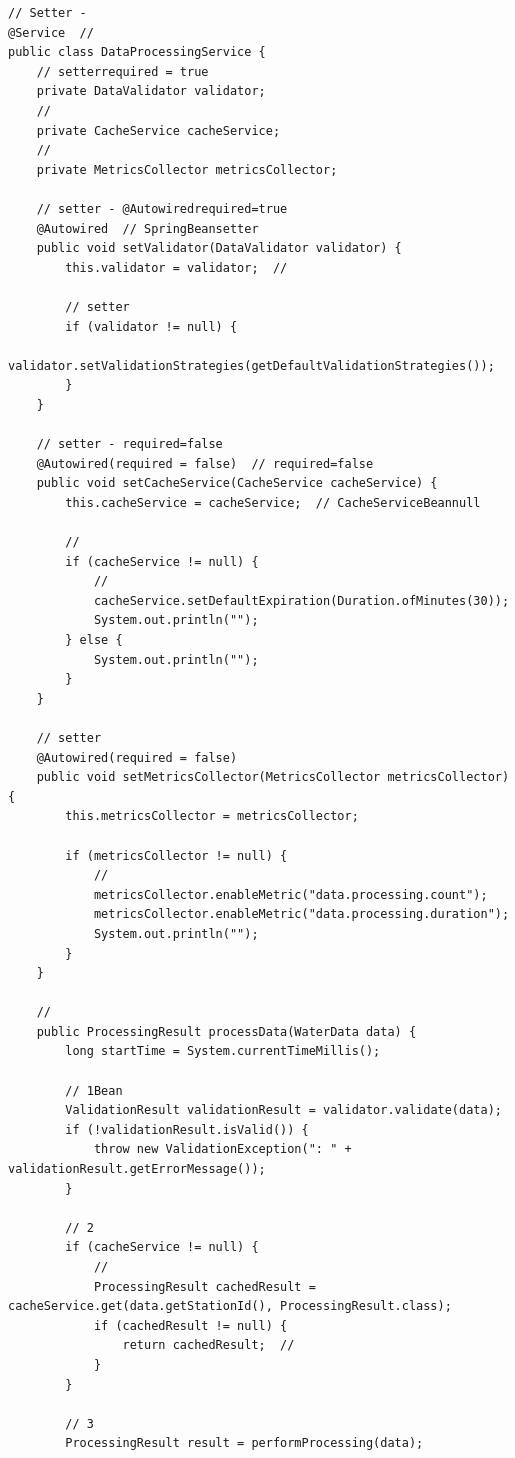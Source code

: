 \begin{lstlisting}[style=java]
// Setter - 
@Service  // 
public class DataProcessingService {
    // setterrequired = true
    private DataValidator validator;
    // 
    private CacheService cacheService;  
    // 
    private MetricsCollector metricsCollector;  
    
    // setter - @Autowiredrequired=true
    @Autowired  // SpringBeansetter
    public void setValidator(DataValidator validator) {
        this.validator = validator;  // 
        
        // setter
        if (validator != null) {
            validator.setValidationStrategies(getDefaultValidationStrategies());
        }
    }
    
    // setter - required=false
    @Autowired(required = false)  // required=false
    public void setCacheService(CacheService cacheService) {
        this.cacheService = cacheService;  // CacheServiceBeannull
        
        // 
        if (cacheService != null) {
            // 
            cacheService.setDefaultExpiration(Duration.ofMinutes(30));
            System.out.println("");
        } else {
            System.out.println("");
        }
    }
    
    // setter
    @Autowired(required = false)
    public void setMetricsCollector(MetricsCollector metricsCollector) {
        this.metricsCollector = metricsCollector;
        
        if (metricsCollector != null) {
            // 
            metricsCollector.enableMetric("data.processing.count");
            metricsCollector.enableMetric("data.processing.duration");
            System.out.println("");
        }
    }
    
    // 
    public ProcessingResult processData(WaterData data) {
        long startTime = System.currentTimeMillis();
        
        // 1Bean
        ValidationResult validationResult = validator.validate(data);
        if (!validationResult.isValid()) {
            throw new ValidationException(": " + validationResult.getErrorMessage());
        }
        
        // 2
        if (cacheService != null) {
            // 
            ProcessingResult cachedResult = cacheService.get(data.getStationId(), ProcessingResult.class);
            if (cachedResult != null) {
                return cachedResult;  // 
            }
        }
        
        // 3
        ProcessingResult result = performProcessing(data);
        

\end{lstlisting}
